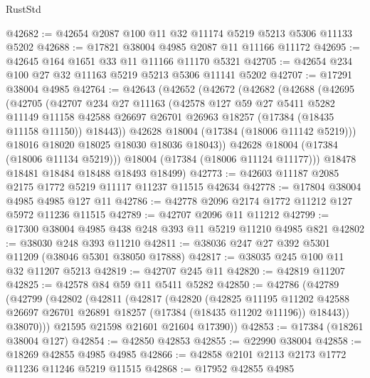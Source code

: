 \begin{lexlean}{RustStd}
\begin{coremodule}
@42682 := @42654 @2087 @100 @11 @32 @11174 @5219 @5213 @5306 @11133 @5202
@42688 := @17821 @38004 @4985 @2087 @11 @11166 @11172
@42695 := @42645 @164 @1651 @33 @11 @11166 @11170 @5321
@42705 := @42654 @234 @100 @27 @32 @11163 @5219 @5213 @5306 @11141 @5202
@42707 := @17291 @38004 @4985
@42764 := @42643
    (@42652
      (@42672
        (@42682
          (@42688
            (@42695
              (@42705
                (@42707
                  @234
                  @27
                  @11163
                  (@42578
                    @127
                    @59
                    @27
                    @5411
                    @5282
                    @11149
                    @11158
                    @42588
                    @26697
                    @26701
                    @26963
                    @18257
                    (@17384 (@18435 @11158 @11150))
                    @18443))
                @42628
                @18004
                (@17384 (@18006 @11142 @5219)))
              @18016
              @18020
              @18025
              @18030
              @18036
              @18043))
          @42628
          @18004
          (@17384 (@18006 @11134 @5219)))
        @18004
        (@17384 (@18006 @11124 @11177)))
      @18478
      @18481
      @18484
      @18488
      @18493
      @18499)
@42773 := @42603 @11187 @2085 @2175 @1772 @5219 @11117 @11237 @11515 @42634
@42778 := @17804 @38004 @4985 @4985 @127 @11
@42786 := @42778 @2096 @2174 @1772 @11212 @127 @5972 @11236 @11515
@42789 := @42707 @2096 @11 @11212
@42799 := @17300 @38004 @4985 @438 @248 @393 @11 @5219 @11210 @4985 @821
@42802 := @38030 @248 @393 @11210
@42811 := @38036 @247 @27 @392 @5301 @11209 (@38046 @5301 @38050 @17888)
@42817 := @38035 @245 @100 @11 @32 @11207 @5213
@42819 := @42707 @245 @11
@42820 := @42819 @11207
@42825 := @42578 @84 @59 @11 @5411 @5282
@42850 := @42786
    (@42789
      (@42799
        (@42802
          (@42811
            (@42817
              (@42820
                (@42825
                  @11195
                  @11202
                  @42588
                  @26697
                  @26701
                  @26891
                  @18257
                  (@17384 (@18435 @11202 @11196))
                  @18443))
              @38070)))
        @21595
        @21598
        @21601
        @21604
        @17390))
@42853 := @17384 (@18261 @38004 @127)
@42854 := @42850 @42853
@42855 := @22990 @38004
@42858 := @18269 @42855 @4985 @4985
@42866 := @42858 @2101 @2113 @2173 @1772 @11236 @11246 @5219 @11515
@42868 := @17952 @42855 @4985

\end{coremodule}
\end{lexlean}
